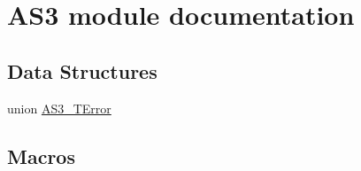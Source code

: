 \hypertarget{group___a_s3__module}{}\section{A\+S3 module documentation}
\label{group___a_s3__module}
\subsection*{Data Structures}
\begin{DoxyCompactItemize}
\item 
union \hyperlink{union_a_s3___t_error}{A\+S3\+\_\+\+T\+Error}
\end{DoxyCompactItemize}
\subsection*{Macros}

